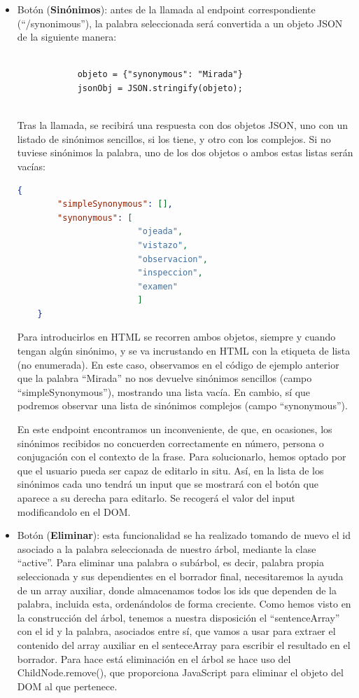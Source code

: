 \begin{itemize}
	\item Botón (\textbf{Sinónimos}): antes de la llamada al endpoint correspondiente (``/synonimous''), la palabra seleccionada será convertida a un objeto JSON de la siguiente manera:
	\begin{lstlisting}
	       
	        objeto = {"synonymous": "Mirada"}
	        jsonObj = JSON.stringify(objeto);
	
	\end{lstlisting}
	Tras la llamada, se recibirá una respuesta con dos objetos JSON, uno con un listado de sinónimos sencillos, si los tiene, y otro con los complejos. Si no tuviese sinónimos la palabra, uno de los dos objetos o ambos estas listas serán vacías:
		\begin{lstlisting}[language=json,firstnumber=1]
		{
		"simpleSynonymous": [],
		"synonymous": [
						"ojeada",
						"vistazo",
						"observacion",
						"inspeccion",
						"examen"
						]
	}
	\end{lstlisting}
	


	Para introducirlos en HTML se recorren ambos objetos, siempre y cuando tengan algún sinónimo, y se va incrustando en HTML con la etiqueta de lista (no enumerada). En este caso, observamos en el código de ejemplo anterior que la palabra ``Mirada'' no nos devuelve sinónimos sencillos (campo ``simpleSynonymous''), mostrando una lista vacía. En cambio, sí que podremos observar una lista de sinónimos complejos (campo ``synonymous'').
	
	En este endpoint encontramos un inconveniente, de que, en ocasiones, los sinónimos recibidos no concuerden correctamente en número, persona o conjugación con el contexto de la frase. Para solucionarlo, hemos optado por que el usuario pueda ser capaz de editarlo in situ. Así, en la lista de los sinónimos cada uno tendrá un input que se mostrará con el botón que aparece a su derecha para editarlo. Se recogerá el valor del input modificandolo en el DOM.
	

	\item Botón (\textbf{Eliminar}): esta funcionalidad se ha realizado tomando de nuevo el id asociado a la palabra seleccionada de nuestro árbol, mediante la clase ``active''. Para eliminar una palabra o subárbol, es decir, palabra propia seleccionada y sus dependientes en el borrador final, necesitaremos la ayuda de un array auxiliar, donde almacenamos todos los ids que dependen de la palabra, incluida esta, ordenándolos de forma creciente. Como hemos visto en la construcción del árbol, tenemos a nuestra disposición el ``sentenceArray'' con el id y la palabra, asociados entre sí, que vamos a usar para extraer el contenido del array auxiliar en el senteceArray  para escribir el resultado en el borrador. Para hace está eliminación en el árbol se hace uso del ChildNode.remove(), que proporciona JavaScript para eliminar el objeto del DOM al que pertenece.





\end{itemize}

